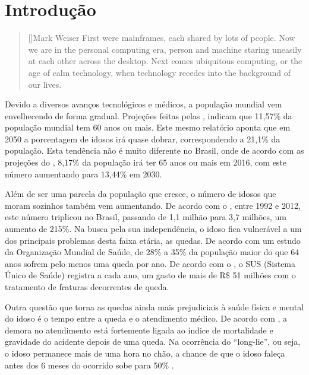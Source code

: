 \chapter{Introdução}
\label{cap:introducao}

\begin{quotation}[]{Mark Weiser}
First were mainframes, each shared by lots of people. Now we are in the personal computing era, person and machine staring uneasily at each other across the desktop. Next comes ubiquitous computing, or the age of calm technology, when technology recedes into the background of our lives. 






\end{quotation}

Devido a diversos avanços tecnológicos e médicos, a população mundial vem envelhecendo de forma gradual. Projeções feitas pelas \cite{unPopulation:13}, indicam que 11,57\% da população mundial tem 60 anos ou mais. Este mesmo relatório aponta que em 2050 a porcentagem de idosos irá quase dobrar, correspondendo a 21,1\% da população. Esta tendência não é muito diferente no Brasil, onde de acordo com as projeções do \cite{ibgePopulation:16}, 8,17\% da população irá ter 65 anos ou mais em 2016, com este número aumentando para 13,44\% em 2030.

Além de ser uma parcela da população que cresce, o número de idosos que moram sozinhos também vem aumentando. De acordo com o \cite{PNAD:12}, entre 1992 e 2012,  este número triplicou no Brasil, passando de 1,1 milhão para 3,7 milhões, um aumento de 215\%. Na busca pela sua independência, o idoso fica vulnerável a um dos principais problemas desta faixa etária, as quedas. De acordo com um estudo da Organização Mundial de Saúde,  de 28\% a 35\% da população maior do que 64 anos sofrem pelo menos uma queda por ano. De acordo com o \cite{portalBrasilQuedas:12}, o SUS (Sistema Único de Saúde) registra a cada ano, um gasto de mais de R\$ 51 milhões com o tratamento de fraturas decorrentes de queda.

Outra questão que torna as quedas ainda mais prejudiciais à saúde física e mental do idoso é o tempo entre a queda e o  atendimento médico. De acordo com \cite{bookFallOlderPeople:01}, a demora no atendimento está fortemente ligada ao índice de mortalidade e gravidade do acidente depois de uma queda. Na ocorrência do “long-lie”, ou seja, o idoso permanece mais de uma hora no chão, a chance de que o idoso faleça antes dos 6 meses do ocorrido sobe para 50\% \citep{wild1981dangerous}.

